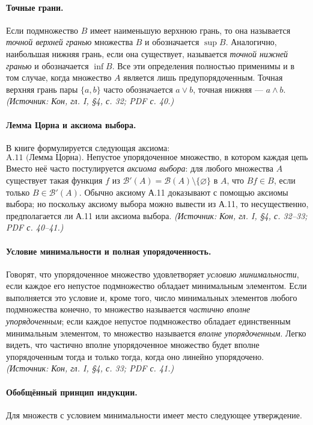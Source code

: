 \documentclass[a4paper,12pt]{article}
\begin{document}
\paragraph{Точные грани.}
Если подмножество \(B\) имеет наименьшую верхнюю грань, то она называется \emph{точной верхней гранью} множества \(B\) и обозначается \(\sup B\). Аналогично, наибольшая нижняя грань, если она существует, называется \emph{точной нижней гранью} и обозначается \(\inf B\). Все эти определения полностью применимы и в том случае, когда множество \(A\) является лишь предупорядоченным. Точная верхняя грань пары \(\{a,b\}\) часто обозначается \(a\vee b\), точная нижняя — \(a\wedge b\).
\textit{(Источник: Кон, гл. I, §4, с. 32; PDF с. 40.)}

\paragraph{Лемма Цорна и аксиома выбора.}
В книге формулируется следующая аксиома:
\[
\text{A.11 (Лемма Цорна). Непустое упорядоченное множество, в котором каждая цепь обладает верхней гранью, имеет максимальный элемент.}
\]
Вместо неё часто постулируется \emph{аксиома выбора}: для любого множества \(A\) существует такая функция \(f\) из \(\mathcal{B}'(A)=\mathcal{B}(A)\setminus\{\varnothing\}\) в \(A\), что \(Bf\in B\), если только \(B\in\mathcal{B}'(A)\). Обычно аксиому А.11 доказывают с помощью аксиомы выбора; но поскольку аксиому выбора можно вывести из А.11, то несущественно, предполагается ли А.11 или аксиома выбора.
\textit{(Источник: Кон, гл. I, §4, с. 32--33; PDF с. 40--41.)}

\paragraph{Условие минимальности и полная упорядоченность.}
Говорят, что упорядоченное множество удовлетворяет \emph{условию минимальности}, если каждое его непустое подмножество обладает минимальным элементом. Если выполняется это условие и, кроме того, число минимальных элементов любого подмножества конечно, то множество называется \emph{частично вполне упорядоченным}; если каждое непустое подмножество обладает единственным минимальным элементом, то множество называется \emph{вполне упорядоченным}. Легко видеть, что частично вполне упорядоченное множество будет вполне упорядоченным тогда и только тогда, когда оно линейно упорядочено.
\textit{(Источник: Кон, гл. I, §4, с. 33; PDF с. 41.)}

\paragraph{Обобщённый принцип индукции.}
Для множеств с условием минимальности имеет место следующее утверждение.
\end{document}
